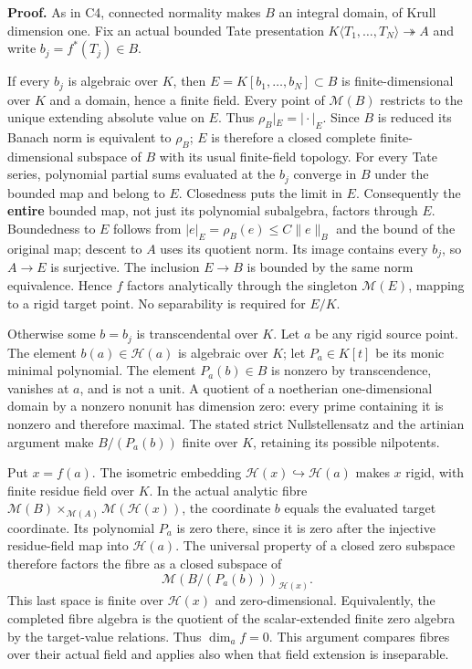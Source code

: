 \documentclass[
  10pt,
]{article}
\begin{document}
\textbf{Proof.} As in C4, connected normality makes \(B\) an integral
domain, of Krull dimension one. Fix an actual bounded Tate presentation
\(K\langle T_1,\ldots,T_N\rangle\twoheadrightarrow A\) and write
\(b_j=f^*(T_j)\in B\).

If every \(b_j\) is algebraic over \(K\), then
\(E=K[b_1,\ldots,b_N]\subset B\) is finite-dimensional over \(K\) and a
domain, hence a finite field. Every point of \(\mathcal M(B)\) restricts
to the unique extending absolute value on \(E\). Thus
\(\rho_B|_E=|\cdot|_E\). Since \(B\) is reduced its Banach norm is
equivalent to \(\rho_B\); \(E\) is therefore a closed complete
finite-dimensional subspace of \(B\) with its usual finite-field
topology. For every Tate series, polynomial partial sums evaluated at
the \(b_j\) converge in \(B\) under the bounded map and belong to \(E\).
Closedness puts the limit in \(E\). Consequently the \textbf{entire}
bounded map, not just its polynomial subalgebra, factors through \(E\).
Boundedness to \(E\) follows from \(|e|_E=\rho_B(e)\leq C\|e\|_B\) and
the bound of the original map; descent to \(A\) uses its quotient norm.
Its image contains every \(b_j\), so \(A\to E\) is surjective. The
inclusion \(E\to B\) is bounded by the same norm equivalence. Hence
\(f\) factors analytically through the singleton \(\mathcal M(E)\),
mapping to a rigid target point. No separability is required for
\(E/K\).

Otherwise some \(b=b_j\) is transcendental over \(K\). Let \(a\) be any
rigid source point. The element \(b(a)\in\mathcal H(a)\) is algebraic
over \(K\); let \(P_a\in K[t]\) be its monic minimal polynomial. The
element \(P_a(b)\in B\) is nonzero by transcendence, vanishes at \(a\),
and is not a unit. A quotient of a noetherian one-dimensional domain by
a nonzero nonunit has dimension zero: every prime containing it is
nonzero and therefore maximal. The stated strict Nullstellensatz and the
artinian argument make \(B/(P_a(b))\) finite over \(K\), retaining its
possible nilpotents.

Put \(x=f(a)\). The isometric embedding
\(\mathcal H(x)\hookrightarrow\mathcal H(a)\) makes \(x\) rigid, with
finite residue field over \(K\). In the actual analytic fibre
\(\mathcal M(B)\times_{\mathcal M(A)}\mathcal M(\mathcal H(x))\), the
coordinate \(b\) equals the evaluated target coordinate. Its polynomial
\(P_a\) is zero there, since it is zero after the injective
residue-field map into \(\mathcal H(a)\). The universal property of a
closed zero subspace therefore factors the fibre as a closed subspace of
\[
                 \mathcal M(B/(P_a(b)))_{\mathcal H(x)}.
\] This last space is finite over \(\mathcal H(x)\) and
zero-dimensional. Equivalently, the completed fibre algebra is the
quotient of the scalar-extended finite zero algebra by the target-value
relations. Thus \(\dim_a f=0\). This argument compares fibres over their
actual field and applies also when that field extension is inseparable.
\end{document}
